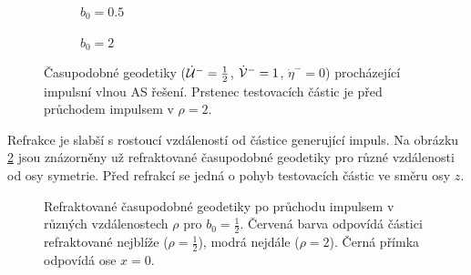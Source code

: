 \begin{figure}[ht]
    \centering
    \begin{subfigure}[b]{0.45\textwidth}
        \caption{$b_0 = 0.5$}
    \end{subfigure}
    \hfill
    \begin{subfigure}[b]{0.45\textwidth}
        \caption{$b_0 = 2$}
    \end{subfigure}
    \caption{Časupodobné geodetiky ($\dot {\mathcal{U}}^-=\frac{1}{2}$, $\dot {\mathcal{V}}^-=1$, $\dot \eta^-=0$) procházející impulsní vlnou AS řešení. Prstenec testovacích částic je před průchodem impulsem v $\rho=2$.}
    \label{fig:AsMatter01}
\end{figure}

Refrakce je slabší s rostoucí vzdáleností od částice generující impuls. Na obrázku \ref{fig:AS_zavislost_na_rho} jsou znázorněny už
refraktované časupodobné geodetiky pro různé vzdálenosti od osy symetrie. Před refrakcí se jedná o pohyb testovacích částic ve směru osy $z$.

\begin{figure}[!ht]
    \centering
    \caption{Refraktované časupodobné geodetiky po průchodu impulsem v různých vzdálenostech $\rho$ pro $b_0 = \frac{1}{2}$.
    Červená barva odpovídá částici refraktované nejblíže ($\rho=\frac{1}{2}$), modrá nejdále ($\rho = 2$). Černá přímka odpovídá
    ose $x=0$.}
    \label{fig:AS_zavislost_na_rho}
\end{figure}


